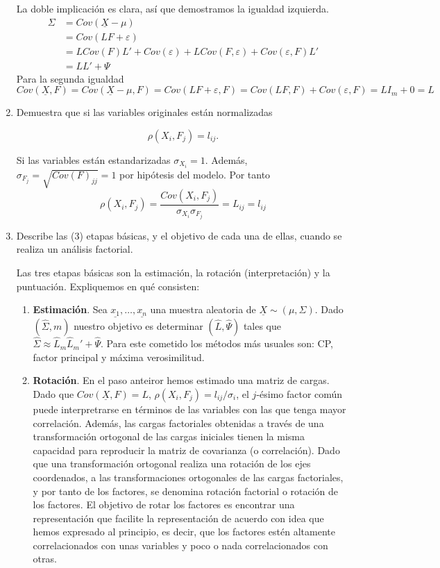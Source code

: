 \documentclass[twoside]{article}
\newcommand{\muestra}[1]{{\underline{#1}}}
\newcommand{\m}[1]{{\muestra{#1}}}
\newcommand{\mX}{{\muestra{X}}}
\begin{document}
\begin{enumerate}
La doble implicación es clara, así que demostramos la igualdad izquierda.
\begin{align*}
\Sigma &= Cov(\mX-\mu) \\
&= Cov(LF+\varepsilon)\\
&= LCov(F)L' + Cov(\varepsilon) +LCov(F,\varepsilon)+Cov(\varepsilon,F)L' \\
&= LL'+\Psi
\end{align*}
Para la segunda igualdad
$$
Cov(\mX,F) = Cov(\mX-\mu,F) = Cov(LF+\varepsilon,F) = Cov(LF,F)+Cov(\varepsilon,F) = LI_m + 0 = L
$$
\item Demuestra que si las variables originales están normalizadas

\[ \rho(X_i, F_j) = l_{ij}. \]

Si las variables están estandarizadas ${\sigma}_{X_i}=1$. Además, $\sigma_{F_j}=\sqrt{Cov(F)_{jj}} = 1$ por hipótesis del modelo. Por tanto
$$
\rho(X_i,F_j) = \frac{Cov(X_i,F_j)}{\sigma_{X_i}\sigma_{F_j}} = L_{ij} = l_{ij}
$$
\item Describe las (3) etapas básicas, y el objetivo de cada una de ellas, cuando se realiza un análisis factorial.

Las tres etapas básicas son la estimación, la rotación (interpretación) y la puntuación. Expliquemos en qué consisten:

\begin{enumerate}
\item \textbf{Estimación}. Sea $\muestra{x_1},\dotsc,\muestra{x_n}$ una muestra aleatoria de $\mX\sim (\mu,\Sigma)$. Dado $(\hat{\Sigma},m)$ nuestro objetivo es determinar $(\hat{L},\hat{\Psi})$ tales que $\hat{\Sigma}\approx \hat{L}_m\hat{L}_m'+\hat{\Psi}$. Para este cometido los métodos más usuales son: CP, factor principal y máxima verosimilitud.
\item \textbf{Rotación}. En el paso anteiror hemos estimado una matriz de cargas. Dado que $Cov(\m{X},F) = L$, $\rho(X_i,F_j)=l_{ij}/\sigma_i$, el $j$-ésimo factor común puede interpretrarse en términos de las variables con las que tenga mayor correlación. Además, las cargas factoriales obtenidas a través de una transformación ortogonal de las cargas iniciales tienen la misma capacidad para reproducir la matriz de covarianza (o correlación). Dado que una transformación ortogonal realiza una rotación de los ejes coordenados, a las transformaciones ortogonales de las cargas factoriales, y por tanto de los factores, se denomina rotación factorial o rotación de los factores. El objetivo de rotar los factores es encontrar una representación que facilite la representación de acuerdo con idea que hemos expresado al principio, es decir, que los factores estén altamente correlacionados con unas variables y poco o nada correlacionados con otras.


\end{enumerate}
\end{enumerate}
\end{document}
